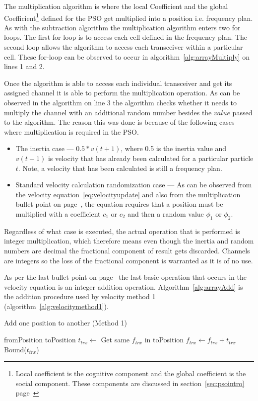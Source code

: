The multiplication algorithm is where the local Coefficient and the global Coefficient\footnote{Local coefficient is the cognitive component and the global coefficient is the social component. These components are discussed in section~\ref{sec:psointro} page~\pageref{def:socialcomponent}} defined for the PSO get multiplied into a position i.e. frequency plan. As with the subtraction algorithm the multiplication algorithm enters two for loops. The first for loop is to access each cell defined in the frequency plan. The second loop allows the algorithm to access each transceiver within a particular cell. These for-loop can be observed to occur in algorithm~\ref{alg:arrayMultiply} on lines 1 and 2.

Once the algorithm is able to access each individual transceiver and get its assigned channel it is able to perform the multiplication operation. As can be observed in the algorithm on line 3 the algorithm checks whether it needs to multiply the channel with an additional random number besides the $value$ passed to the algorithm. The reason this was done is because of the following cases where multiplication is required in the PSO.

\begin{itemize}
\item The inertia case --- $0.5 * v(t+1)$, where 0.5 is the inertia value and $v(t+1)$ is velocity that has already been calculated for a particular particle $t$. Note, a velocity that has been calculated is still a frequency plan.
\item Standard velocity calculation randomization case --- As can be observed from the velocity equation~\ref{eq:velocityupdate} and also from the multiplication bullet point on page~\pageref{lst:velocitybreakup}, the equation requires that a position must be multiplied with a coefficient $c_1$ or $c_2$ and then a random value $\phi_1$ or $\phi_2$. 
\end{itemize}

Regardless of what case is executed, the actual operation that is performed is integer multiplication, which therefore means even though the inertia and random numbers are decimal the fractional component of result gets discarded. Channels are integers so the loss of the fractional component is warranted as it is of no use.

As per the last bullet point on page~\pageref{lst:velocitybreakup} the last basic operation that occurs in the velocity equation is an integer addition operation. Algorithm~\ref{alg:arrayAdd} is the addition procedure used by velocity method 1 (algorithm~\ref{alg:velocitymethod1}).
\begin{algorithm}
\caption{Add one position to another (Method 1)}
\label{alg:arrayAdd}
\begin{algorithmic}[1]
	\REQUIRE fromPosition
	\REQUIRE toPosition
			\STATE $t_{trx} \leftarrow$ Get same $f_{trx}$ in toPosition
			\STATE $f_{trx} \leftarrow f_{trx} + t_{trx}$
			\STATE Bound($t_{trx}$)
		\ENDFOR
	\ENDFOR
\end{algorithmic}
\end{algorithm}


